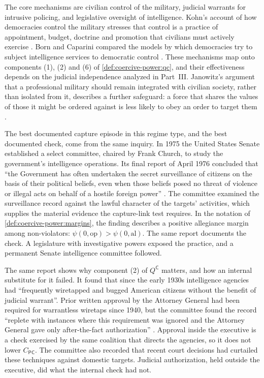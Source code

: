 \documentclass[11pt,letterpaper]{article}
\theoremstyle{definition}
\theoremstyle{remark}
\newcommand{\pP}{\mathsf{P}}
\newcommand{\pC}{\mathsf{C}}
\begin{document}
The core mechanisms are civilian control of the military, judicial warrants for intrusive policing, and legislative oversight of intelligence. Kohn's account of how democracies control the military stresses that control is a practice of appointment, budget, doctrine and promotion that civilians must actively exercise \citep{kohn1997}. Born and Caparini compared the models by which democracies try to subject intelligence services to democratic control \citep{born2007}. These mechanisms map onto components (1), (2) and (6) of \cref{def:coercive-power:qc}, and their effectiveness depends on the judicial independence analyzed in Part~III. Janowitz's argument that a professional military should remain integrated with civilian society, rather than isolated from it, describes a further safeguard: a force that shares the values of those it might be ordered against is less likely to obey an order to target them \citep{janowitz1960}.

The best documented capture episode in this regime type, and the best documented check, come from the same inquiry. In 1975 the United States Senate established a select committee, chaired by Frank Church, to study the government's intelligence operations. Its final report of April 1976 concluded that ``the Government has often undertaken the secret surveillance of citizens on the basis of their political beliefs, even when those beliefs posed no threat of violence or illegal acts on behalf of a hostile foreign power'' \citep[Book II, Part I, Section C]{church1976}. The committee examined the surveillance record against the lawful character of the targets' activities, which supplies the material evidence the capture-link test requires. In the notation of \cref{def:coercive-power:margins}, the finding describes a positive allegiance margin among non-violators: $\psi(0,\mathrm{op}) > \psi(0,\mathrm{al})$. The same report documents the check. A legislature with investigative powers exposed the practice, and a permanent Senate intelligence committee followed.

The same report shows why component (2) of $Q^{\pC}$ matters, and how an internal substitute for it failed. It found that since the early 1930s intelligence agencies had ``frequently wiretapped and bugged American citizens without the benefit of judicial warrant''. Prior written approval by the Attorney General had been required for warrantless wiretaps since 1940, but the committee found the record ``replete with instances where this requirement was ignored and the Attorney General gave only after-the-fact authorization'' \citep[Book II, Part I]{church1976}. Approval inside the executive is a check exercised by the same coalition that directs the agencies, so it does not lower $C_{\pP\pC}$. The committee also recorded that recent court decisions had curtailed these techniques against domestic targets. Judicial authorization, held outside the executive, did what the internal check had not.
\end{document}
